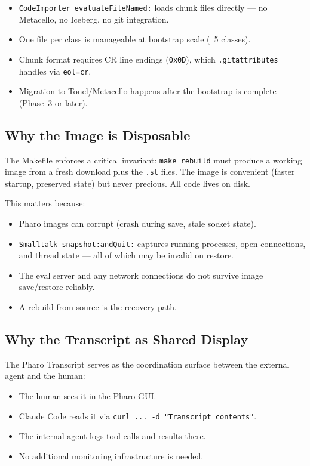 \documentclass[a4paper,10pt,fleqn]{article}
\begin{document}
\begin{itemize}
  \item \texttt{CodeImporter evaluateFileNamed:} loads chunk files
    directly --- no Metacello, no Iceberg, no git integration.
  \item One file per class is manageable at bootstrap scale (~5 classes).
  \item Chunk format requires CR line endings (\texttt{0x0D}), which
    \texttt{.gitattributes} handles via \texttt{eol=cr}.
  \item Migration to Tonel/Metacello happens after the bootstrap is
    complete (Phase~3 or later).
\end{itemize}

\subsection{Why the Image is Disposable}

The Makefile enforces a critical invariant: \texttt{make rebuild} must
produce a working image from a fresh download plus the \texttt{.st}
files.  The image is convenient (faster startup, preserved state) but
never precious.  All code lives on disk.

This matters because:
\begin{itemize}
  \item Pharo images can corrupt (crash during save, stale socket state).
  \item \texttt{Smalltalk snapshot:andQuit:} captures running processes,
    open connections, and thread state --- all of which may be invalid
    on restore.
  \item The eval server and any network connections do not survive image
    save/restore reliably.
  \item A rebuild from source is the recovery path.
\end{itemize}

\subsection{Why the Transcript as Shared Display}

The Pharo Transcript serves as the coordination surface between the
external agent and the human:

\begin{itemize}
  \item The human sees it in the Pharo GUI.
  \item Claude Code reads it via
    \texttt{curl ... -d "Transcript contents"}.
  \item The internal agent logs tool calls and results there.
  \item No additional monitoring infrastructure is needed.
\end{itemize}
\end{document}
